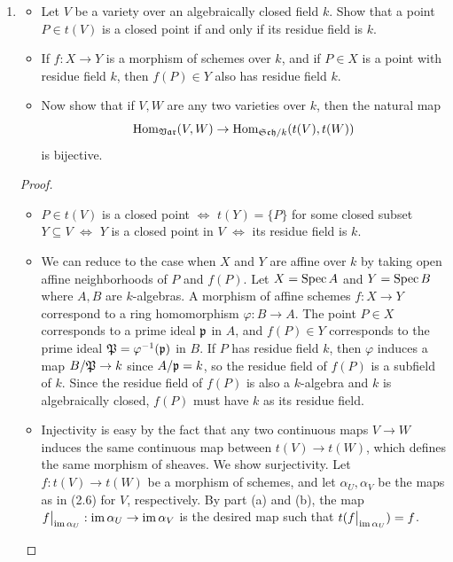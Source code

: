 \documentclass[a4paper]{article}
\begin{document}
\begin{enumerate} [label=\textbf{\arabic*.}, leftmargin=0em]
\item[\textbf{15.}] \begin{itemize}
    \item[(a)] Let $V$ be a variety over an algebraically closed field $k$. Show that a point $P \in t(V)$ is a closed point if and only if its residue field is $k$.
    \item[(b)] If $f : X \to Y$ is a morphism of schemes over $k$, and if $P \in X$ is a point with residue field $k$, then $f(P) \in Y$ also has residue field $k$.
    \item[(c)] Now show that if $V, W$ are any two varieties over $k$, then the natural map
    \begin{equation*}
        \operatorname{Hom}_{\mathfrak{Var}}(V, W) \to \operatorname{Hom}_{\mathfrak{Sch}/k}(t(V), t(W))
    \end{equation*}
    is bijective.
\end{itemize}

\begin{proof} $ $ \vspace{0pt}
    \begin{itemize} [leftmargin=0cm]
        \item[(a)] $P \in t(V)$ is a closed point $\Leftrightarrow$ $t(Y) = \{ P \}$ for some closed subset $Y \subseteq V$ $\Leftrightarrow$ $Y$ is a closed point in $V$ $\Leftrightarrow$ its residue field is $k$.

        \item[(b)] We can reduce to the case when $X$ and $Y$ are affine over $k$ by taking open affine neighborhoods of $P$ and $f(P)$. Let $X = \operatorname{Spec}{A}$ and $Y = \operatorname{Spec}{B}$ where $A, B$ are $k$-algebras. A morphism of affine schemes $f : X \to Y$ correspond to a ring homomorphism $\varphi : B \to A$. The point $P \in X$ corresponds to a prime ideal $\mathfrak{p}$ in $A$, and $f(P) \in Y$ corresponds to the prime ideal $\mathfrak{P} = \varphi^{-1}(\mathfrak{p})$ in $B$. If $P$ has residue field $k$, then $\varphi$ induces a map $B / \mathfrak{P} \to  k$ since $A / \mathfrak{p} = k$, so the residue field of $f(P)$ is a subfield of $k$. Since the residue field of $f(P)$ is also a $k$-algebra and $k$ is algebraically closed, $f(P)$ must have $k$ as its residue field.

        \item[(c)] Injectivity is easy by the fact that any two continuous maps $V \to W$ induces the same continuous map between $t(V) \to t(W)$, which defines the same morphism of sheaves. We show surjectivity. Let $f : t(V) \to t(W)$ be a morphism of schemes, and let $\alpha_{U}, \alpha_V$ be the maps as in (2.6) for $V$, respectively. By part (a) and (b), the map $\restr{f}{\im{\alpha_U}} : \im{\alpha_U} \to \im{\alpha_V}$ is the desired map such that $t(\restr{f}{\im{\alpha_U}}) = f$.
    \end{itemize}
\end{proof}


\end{enumerate}
\end{document}
